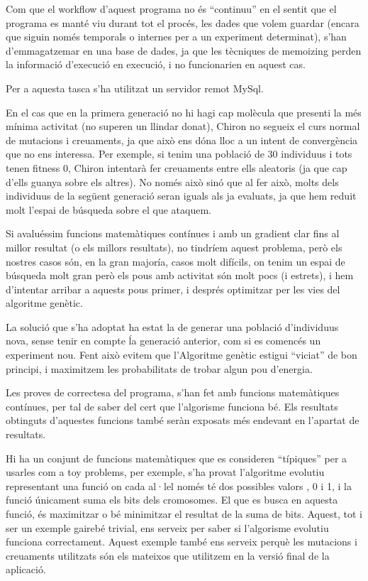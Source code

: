 \documentclass[titlepage,a4paper,12pt]{book}
\begin{document}
Com que el workflow d'aquest programa no és ``continuu'' en el sentit que el
programa es manté viu durant tot el procés, les dades que volem guardar (encara
que siguin només temporals o internes per a un experiment determinat), s'han
d'emmagatzemar en una base de dades, ja que les tècniques de memoizing %
perden la informació d'execució en execució, i no funcionarien en aquest cas.

Per a aquesta tasca s'ha utilitzat un servidor remot MySql.

En el cas que en la primera generació no hi hagi cap molècula que presenti la
més mínima activitat (no superen un llindar donat), Chiron no segueix el curs
normal de mutacions i creuaments, ja que això ens dóna lloc a un intent de
convergència que no ens interessa.  Per exemple, si tenim una població de 30
individuus i tots tenen fitness 0, Chiron intentarà fer creuaments entre ells
aleatoris (ja que cap d'ells guanya sobre els altres).  No només això sinó que
al fer això, molts dels individuus de la següent generació seran iguals als ja
evaluats, ja que hem reduit molt l'espai de búsqueda sobre el que ataquem.

Si avaluéssim funcions matemàtiques contínues i amb un gradient clar fins al
millor resultat (o els millors resultats), no tindríem aquest problema, però els
nostres casos són, en la gran majoría, casos molt difícils, on tenim un espai de
búsqueda molt gran però els pous amb activitat són molt pocs (i estrets), i hem
d'intentar arribar a aquests pous primer, i després optimitzar per les vies del
algoritme genètic.

La solució que s'ha adoptat ha estat la de generar una població d'individuus
nova, sense tenir en compte ĺa generació anterior, com si es comencés un
experiment nou.  Fent això evitem que l'Algoritme genètic estigui ``viciat'' de
bon principi, i maximitzem les probabilitats de trobar algun pou d'energia.

Les proves de correctesa del programa, s'han fet amb funcions matemàtiques
contínues, per tal de saber del cert que l'algorisme funciona bé.  Els resultats
obtinguts d'aquestes funcions també seràn exposats més endevant en l'apartat de
resultats. 

Hi ha un conjunt de funcions matemàtiques que es consideren ``típiques'' per a
usarles com a toy problems, per exemple, s'ha provat l'algoritme evolutiu
representant una funció on cada al·lel només té dos possibles valors , 0 i 1, i
la funció únicament suma els bits dels cromosomes.  El que es busca en aquesta
funció, és maximitzar o bé minimitzar el resultat de la suma de bits.  Aquest,
tot i ser un exemple gairebé trivial, ens serveix per saber si l'algorisme
evolutiu funciona correctament.  Aquest exemple també ens serveix perquè les
mutacions i creuaments utilitzats són els mateixos que utilitzem en la versió
final de la aplicació.
\end{document}
